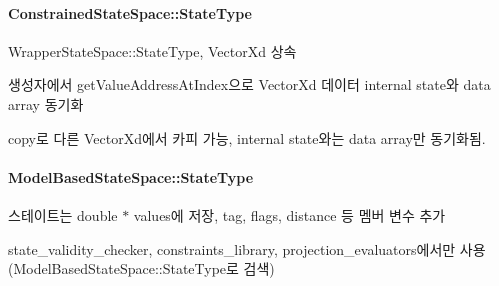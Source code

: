 \paragraph*{Constrained\+State\+Space\+::\+State\+Type}


\begin{DoxyItemize}
\item Wrapper\+State\+Space\+::\+State\+Type, Vector\+Xd 상속
\item 생성자에서 get\+Value\+Address\+At\+Index으로 Vector\+Xd 데이터 internal state와 data array 동기화
\item copy로 다른 Vector\+Xd에서 카피 가능, internal state와는 data array만 동기화됨.
\end{DoxyItemize}

\paragraph*{Model\+Based\+State\+Space\+::\+State\+Type}


\begin{DoxyItemize}
\item 스테이트는 double $\ast$ values에 저장, tag, flags, distance 등 멤버 변수 추가
\item state\+\_\+validity\+\_\+checker, constraints\+\_\+library, projection\+\_\+evaluators에서만 사용 (Model\+Based\+State\+Space\+::\+State\+Type로 검색) 
\end{DoxyItemize}
